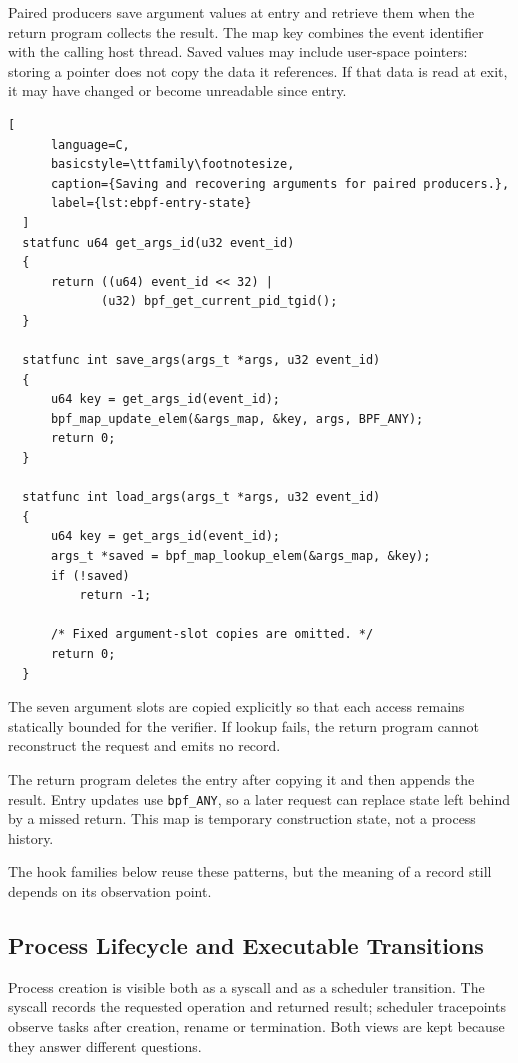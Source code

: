 Paired producers save argument values at entry and retrieve them when the
return program collects the result. The map key combines the event identifier
with the calling host thread. Saved values may include user-space pointers:
storing a pointer does not copy the data it references. If that data is read
at exit, it may have changed or become unreadable since entry.

\begin{lstlisting}[
      language=C,
      basicstyle=\ttfamily\footnotesize,
      caption={Saving and recovering arguments for paired producers.},
      label={lst:ebpf-entry-state}
  ]
  statfunc u64 get_args_id(u32 event_id)
  {
      return ((u64) event_id << 32) |
             (u32) bpf_get_current_pid_tgid();
  }

  statfunc int save_args(args_t *args, u32 event_id)
  {
      u64 key = get_args_id(event_id);
      bpf_map_update_elem(&args_map, &key, args, BPF_ANY);
      return 0;
  }

  statfunc int load_args(args_t *args, u32 event_id)
  {
      u64 key = get_args_id(event_id);
      args_t *saved = bpf_map_lookup_elem(&args_map, &key);
      if (!saved)
          return -1;

      /* Fixed argument-slot copies are omitted. */
      return 0;
  }
\end{lstlisting}

The seven argument slots are copied explicitly so that each access remains
statically bounded for the verifier. If lookup fails, the return program cannot
reconstruct the request and emits no record.

The return program deletes the entry after copying it and then appends the
result. Entry updates use \texttt{\gls{bpf}\_ANY}, so a later request can replace
state left behind by a missed return. This map is temporary construction state,
not a process history.

The hook families below reuse these patterns, but the meaning of a record still
depends on its observation point.

\subsection{Process Lifecycle and Executable Transitions}
\label{subsec:implementation-process-execution-hooks}

Process creation is visible both as a syscall and as a scheduler transition.
The syscall records the requested operation and returned result; scheduler
tracepoints observe tasks after creation, rename or termination. Both views are
kept because they answer different questions.


